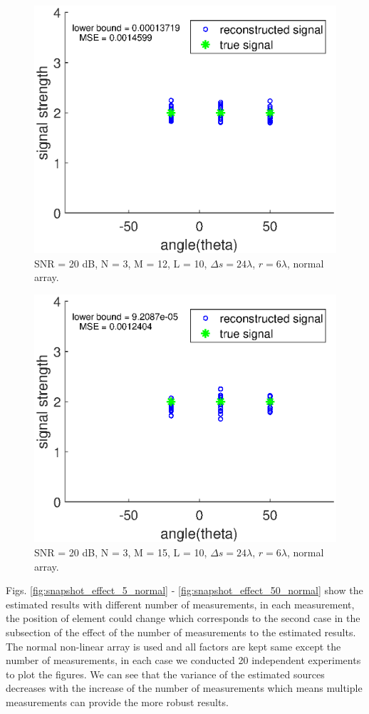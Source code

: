 \documentclass[proposal]{umthesis}          %
\begin{document}
\begin{figure}[H]
	\centering
	\includegraphics[width=0.6\columnwidth]{./results/element_effect_12_normal}
	\caption{SNR = 20 dB, N = 3, M = 12, L = 10, $\Delta s = 24 \lambda$, $r = 6\lambda$, normal array.}
	\label{fig:element_number_effect_12_normal}
\end{figure}

\begin{figure}[H]
	\centering
	\includegraphics[width=0.6\columnwidth]{./results/element_effect_15_normal}
	\caption{SNR = 20 dB, N = 3, M = 15, L = 10, $\Delta s = 24 \lambda$, $r = 6\lambda$, normal array.}
	\label{fig:element_number_effect_15_normal}
\end{figure}

Figs. \ref{fig:snapshot_effect_5_normal} - \ref{fig:snapshot_effect_50_normal} show the estimated results with different number of measurements, in each measurement, the position of element could change which corresponds to the second case in the subsection of the effect of the number of measurements to the estimated results.
The normal non-linear array is used and all factors are kept same except the number of measurements, in each case we conducted 20 independent experiments to plot the figures.
We can see that the variance of the estimated sources decreases with the increase of the number of measurements which means multiple measurements can provide the more robust results. 
\end{document}
